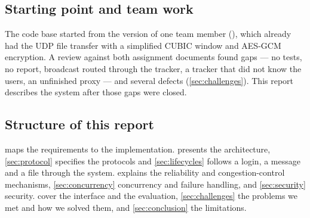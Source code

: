\subsection{Starting point and team work}
The code base started from the version of one team member (), which already had the UDP
file transfer with a simplified CUBIC window and AES-GCM encryption. A review against both assignment
documents found gaps --- no tests, no report, broadcast routed through the tracker, a tracker that
did not know the users, an unfinished proxy --- and several defects (\cref{sec:challenges}). This
report describes the system after those gaps were closed. 

\subsection{Structure of this report}
 maps the requirements to the implementation. 
presents the architecture, \cref{sec:protocol} specifies the protocols and \cref{sec:lifecycles}
follows a login, a message and a file through the system.  explains the
reliability and congestion-control mechanisms, \cref{sec:concurrency} concurrency and failure
handling, and \cref{sec:security} security.  cover the interface and the
evaluation, \cref{sec:challenges} the problems we met and how we solved them, and
\cref{sec:conclusion} the limitations.
